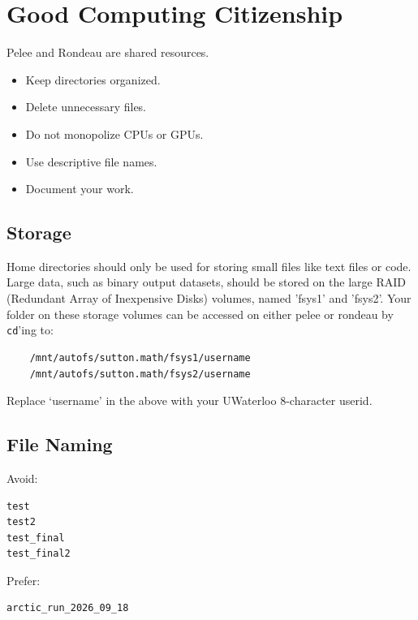 \section{Good Computing Citizenship}

Pelee and Rondeau are shared resources.

\begin{itemize}
\item Keep directories organized.
\item Delete unnecessary files.
\item Do not monopolize CPUs or GPUs.
\item Use descriptive file names.
\item Document your work.
\end{itemize}


\subsection{Storage}

Home directories should only be used for storing small files like text files or code. Large data, such as binary output datasets, should be stored on the large RAID (Redundant Array of Inexpensive Disks) volumes, named 'fsys1' and 'fsys2'. Your folder on these storage volumes can be accessed on either pelee or rondeau by \texttt{cd}'ing to:

\begin{lstlisting}
    /mnt/autofs/sutton.math/fsys1/username
    /mnt/autofs/sutton.math/fsys2/username
\end{lstlisting}
Replace `username' in the above with your UWaterloo 8-character userid.

\subsection{File Naming}

Avoid:

\begin{lstlisting}
test
test2
test_final
test_final2
\end{lstlisting}

Prefer:

\begin{lstlisting}
arctic_run_2026_09_18
\end{lstlisting}

